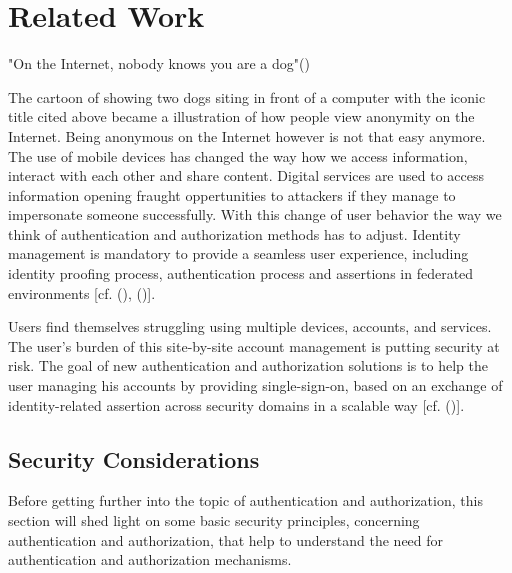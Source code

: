\chapter{Related Work}\label{chap:authenticationandauthorization}

\chapterstart

"On the Internet, nobody knows you are a dog"(\cite{Steiner:Dog:1992})

The cartoon of \cite{Steiner:Dog:1992} showing two dogs siting in front of a computer with the iconic title cited above became a illustration of how people view anonymity on the Internet. Being anonymous on the Internet however is not that easy anymore. The use of mobile devices has changed the way how we access information, interact with each other and share content. Digital services are used to access information opening fraught oppertunities to attackers if they manage to impersonate someone successfully.  With this change of user behavior the way we think of authentication and authorization methods has to adjust. Identity management is mandatory to provide a seamless user experience, including identity proofing process, authentication process and assertions in federated environments [cf. (\cite{NIST:2017:DIG}), (\cite{Corre:2017:WHI})].


 Users find themselves struggling using multiple devices, accounts, and services. The user's burden of this site-by-site account management is putting security at risk. The goal of new authentication and authorization solutions is to help the user managing his accounts by providing single-sign-on, based on an exchange of identity-related assertion across security domains in a scalable way [cf. (\cite{Corre:2017:WHI})].  
  

\section{Security Considerations}

Before getting further into the topic of authentication and authorization, this section will shed light on some basic security principles, concerning authentication and authorization, that help to understand the need for authentication and authorization mechanisms. 

